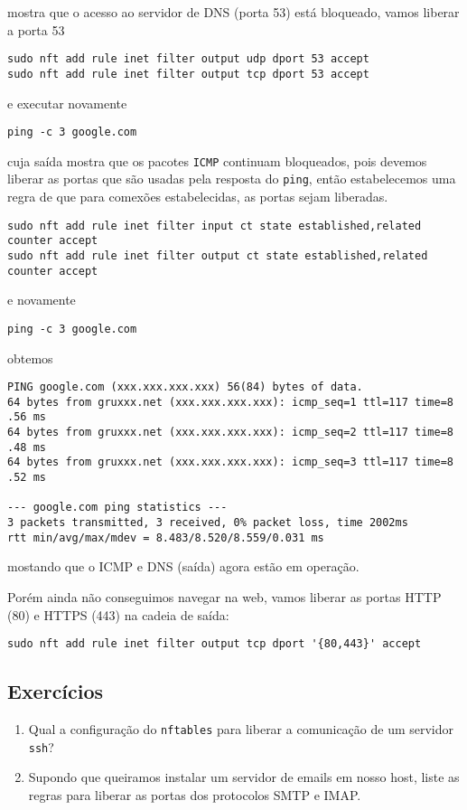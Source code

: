 \noindent mostra que o acesso ao servidor de DNS (porta 53) está bloqueado, 
vamos liberar a porta 53

\begin{lstlisting}
sudo nft add rule inet filter output udp dport 53 accept
sudo nft add rule inet filter output tcp dport 53 accept
\end{lstlisting}
  
e executar novamente

\begin{lstlisting}
ping -c 3 google.com
\end{lstlisting}
  
\noindent cuja saída mostra que os pacotes {\tt ICMP} continuam
bloqueados, pois devemos liberar as portas que são usadas pela
resposta do {\tt ping}, então estabelecemos uma regra de que para
comexões estabelecidas, as portas sejam liberadas.

\begin{lstlisting}
sudo nft add rule inet filter input ct state established,related counter accept  
sudo nft add rule inet filter output ct state established,related counter accept
\end{lstlisting}
  
\noindent e novamente

\begin{lstlisting}
ping -c 3 google.com
\end{lstlisting}

\noindent obtemos

\begin{lstlisting}
PING google.com (xxx.xxx.xxx.xxx) 56(84) bytes of data.
64 bytes from gruxxx.net (xxx.xxx.xxx.xxx): icmp_seq=1 ttl=117 time=8
.56 ms
64 bytes from gruxxx.net (xxx.xxx.xxx.xxx): icmp_seq=2 ttl=117 time=8
.48 ms
64 bytes from gruxxx.net (xxx.xxx.xxx.xxx): icmp_seq=3 ttl=117 time=8
.52 ms

--- google.com ping statistics ---
3 packets transmitted, 3 received, 0% packet loss, time 2002ms
rtt min/avg/max/mdev = 8.483/8.520/8.559/0.031 ms
\end{lstlisting}

\noindent mostando que o ICMP e DNS (saída) agora estão em operação.

Porém ainda não conseguimos navegar na web, vamos liberar as portas
HTTP (80) e HTTPS (443) na cadeia de saída:

\begin{lstlisting}
sudo nft add rule inet filter output tcp dport '{80,443}' accept
\end{lstlisting}

\subsection*{Exercícios}
\begin{enumerate}
\item Qual a configuração do {\tt nftables} para liberar a comunicação
  de um servidor {\tt ssh}?

\item Supondo que queiramos instalar um servidor de emails
  em nosso host, liste as regras para liberar as portas
  dos protocolos SMTP e IMAP.
\end{enumerate}
